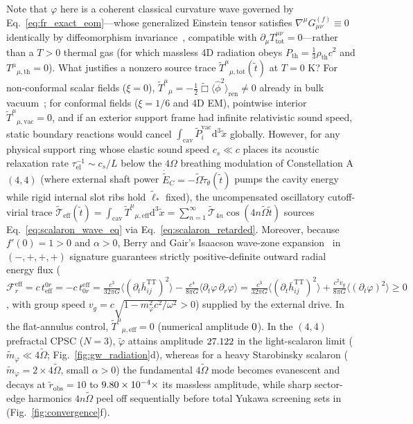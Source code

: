 \documentclass[aps,prd,twocolumn,10pt,showkeys,nofootinbib,floatfix,longbibliography]{revtex4-2}
\newcommand{\dd}{\mathrm{d}}
\begin{document}
Note that $\varphi$ here is a coherent classical curvature wave governed by Eq.~\eqref{eq:fr_exact_eom}---whose generalized Einstein tensor satisfies $\nabla^\mu G_{\mu\nu}^{(f)} \equiv 0$ identically by diffeomorphism invariance~\cite{defelice2010,berry2011}, compatible with $\partial_\mu T^{\mu\nu}_{\mathrm{tot}} = 0$---rather than a $T > 0$ thermal gas (for which massless 4D radiation obeys $P_{\mathrm{th}} = \frac{1}{3}\rho_{\mathrm{th}}c^2$ and $T^\mu{}_{\mu,\mathrm{th}} = 0$). What justifies a nonzero source trace $\tilde{T}^\mu{}_{\mu,\mathrm{tot}}(\tilde{t})$ at $T=0\text{ K}$? For non-conformal scalar fields ($\xi = 0$), $\tilde{T}^\mu{}_\mu = -\frac{1}{2}\tilde{\Box}\langle\hat{\phi}^2\rangle_{\mathrm{ren}} \neq 0$ already in bulk vacuum~\cite{callan1970,deutsch1979}; for conformal fields ($\xi=1/6$ and 4D EM), pointwise interior $\tilde{T}^\mu{}_{\mu,\mathrm{vac}} = 0$, and if an exterior support frame had infinite relativistic sound speed, static boundary reactions would cancel $\int_{\mathrm{cav}} \tilde{P}_i^{\mathrm{vac}}\dd^3\tilde{x}$ globally. However, for any physical support ring whose elastic sound speed $c_s \ll c$ places its acoustic relaxation rate $\tau_{\mathrm{el}}^{-1} \sim c_s/L$ below the $4\Omega$ breathing modulation of Constellation A $(4,4)$ (where external shaft power $\dot{\tilde{E}}_C = -\tilde{\Omega}\tilde{\tau}_\theta(\tilde{t})$ pumps the cavity energy while rigid internal slot ribs hold $\tilde{\ell}_*$ fixed), the uncompensated oscillatory cutoff-virial trace $\tilde{\mathcal{T}}_{\mathrm{eff}}(\tilde{t}) = \int_{\mathrm{cav}}\tilde{T}^\mu{}_{\mu,\mathrm{eff}}\dd^3\tilde{x} = \sum_{n=1}^\infty \tilde{\mathcal{T}}_{4n}\cos(4n\tilde{\Omega}\tilde{t})$ sources Eq.~\eqref{eq:scalaron_wave_eq} via Eq.~\eqref{eq:scalaron_retarded}. Moreover, because $f'(0) = 1 > 0$ and $\alpha > 0$, Berry and Gair's Isaacson wave-zone expansion~\cite{berry2011} in $(-,+,+,+)$ signature guarantees strictly positive-definite outward radial energy flux ($\mathcal{F}_r^{\mathrm{eff}} = c\,t_{\mathrm{eff}}^{0r} = -c\,t_{0r}^{\mathrm{eff}} = \frac{c^3}{32\pi G}\langle (\partial_t\bar{h}_{ij}^{\mathrm{TT}})^2\rangle - \frac{c^4}{8\pi G}\langle\partial_t\varphi\,\partial_r\varphi\rangle = \frac{c^3}{32\pi G}\langle (\partial_t\bar{h}_{ij}^{\mathrm{TT}})^2\rangle + \frac{c^2 v_g}{8\pi G}\langle(\partial_t\varphi)^2\rangle \ge 0$, with group speed $v_g = c\sqrt{1 - m_\varphi^2 c^2/\omega^2} > 0$) supplied by the external drive. In the flat-annulus control, $\tilde{T}^\mu{}_{\mu,\mathrm{eff}} = 0$ (numerical amplitude $0$). In the $(4,4)$ prefractal CPSC ($N=3$), $\tilde{\varphi}$ attains amplitude $27.122$ in the light-scalaron limit ($\tilde{m}_\varphi \ll 4\tilde{\Omega}$; Fig.~\ref{fig:gw_radiation}d), whereas for a heavy Starobinsky scalaron ($\tilde{m}_\varphi = 2\times 4\tilde{\Omega}$, small $\alpha > 0$) the fundamental $4\tilde{\Omega}$ mode becomes evanescent and decays at $\tilde{r}_{\mathrm{obs}} = 10$ to $9.80\times 10^{-4}\times$ its massless amplitude, while sharp sector-edge harmonics $4n\tilde{\Omega}$ peel off sequentially before total Yukawa screening sets in (Fig.~\ref{fig:convergence}f).
\end{document}
